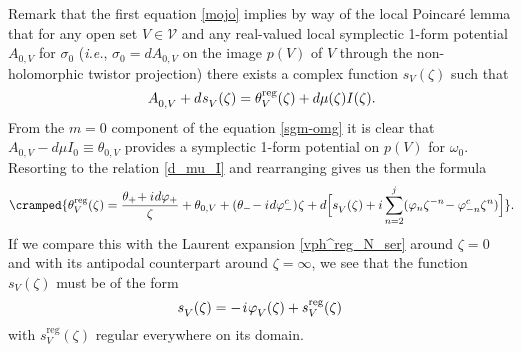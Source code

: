 \documentclass[11pt]{amsart}
\theoremstyle{remark}
\theoremstyle{remark}
\theoremstyle{definition}
\theoremstyle{definition}
\theoremstyle{definition}
\newcommand{\IU}{I\nhp(\nhp\mathbf{u}\hspace{-0.2pt})} %
\newcommand{\0}{{\scriptstyle 0'}} %
\newcommand{\1}{{\scriptstyle 1'}}
\newcommand{\pt}{\hspace{1pt}} %
\newcommand{\hp}{\hspace{0.5pt}} %
\newcommand{\nhp}{\hspace{-0.5pt}} %
\begin{document}
Remark that the first equation \eqref{mojo} implies by way of the local Poincar\'e lemma that for any open set $V \in \mathscr{V}$ and any real-valued local symplectic 1-form potential $A_{0,V}$ for $\sigma_0$ (\textit{i.e.}, \mbox{$\sigma_0 = dA_{0,V}$} on the image $p(V)$ of $V$ through the non-holomorphic twistor projection) there exists a complex function $s_V(\zeta)$ such that
\begin{equation} \label{Trump_is_an_idiot}
A^{\phantom{g}}_{0,V} + d\hp s^{\phantom{g}}_V(\zeta) = \theta^{\text{reg}}_V(\zeta) + d\mu(\zeta)I(\zeta) \rlap{.}
\end{equation}
From the $m=0$ component of the equation \eqref{sgm-omg} it is clear that \mbox{$A_{0,V} - d\mu I_0 \equiv \theta_{0,V}$} provides a symplectic 1-form potential on $p(V)$ for $\omega_0$. Resorting to the relation \eqref{d_mu_I} and rearranging gives us then the formula
\begin{equation} \label{symp_shift}
\cramped{ \theta^{\text{reg}}_V(\zeta)  = \frac{\theta_+\! + i \hp d\varphi_+}{\zeta} + \theta_{0,V} + (\theta_-\! - i \hp d\varphi^c_-) \hp \zeta +  d \Big[ s^{\phantom{g}}_V(\zeta) + i \sum_{n=2}^j(\varphi_n\zeta^{-n} \!- \varphi^c_{-n}\zeta^n) \Big] } \rlap{.}
\end{equation}
If we compare this with the Laurent expansion \eqref{vph^reg_N_ser} around $\zeta = 0$ and with its antipodal counterpart around $\zeta = \infty$, we see that the function $s_V(\zeta)$ must be of the form
\begin{equation} \label{s_V-sing-str}
s^{\phantom{g}}_V(\zeta) =  - \pt i \hp \varphi^{\phantom{g}}_V(\zeta) + s^{\text{reg}}_V(\zeta)
\end{equation}
with $s^{\text{reg}}_V(\zeta)$ regular everywhere on its domain. 
\end{document}
